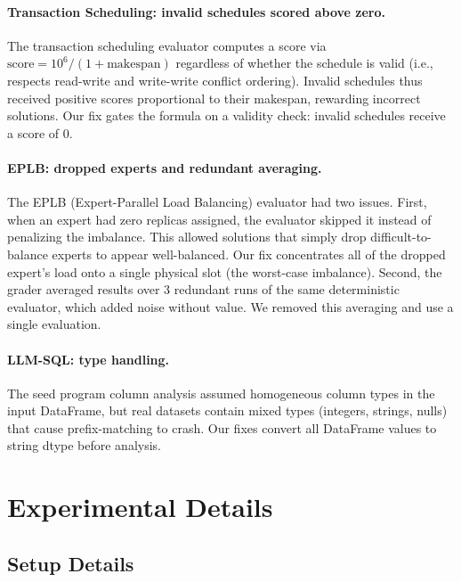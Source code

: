 \paragraph{Transaction Scheduling: invalid schedules scored above zero.}
The transaction scheduling evaluator computes a score via $\text{score} = 10^6 / (1 + \text{makespan})$ regardless of whether the schedule is valid (i.e., respects read-write and write-write conflict ordering). Invalid schedules thus received positive scores proportional to their makespan, rewarding incorrect solutions. Our fix gates the formula on a validity check: invalid schedules receive a score of 0.

\paragraph{EPLB: dropped experts and redundant averaging.}
The EPLB (Expert-Parallel Load Balancing) evaluator had two issues. First, when an expert had zero replicas assigned, the evaluator skipped it instead of penalizing the imbalance. This allowed solutions that simply drop difficult-to-balance experts to appear well-balanced. Our fix concentrates all of the dropped expert's load onto a single physical slot (the worst-case imbalance). Second, the grader averaged results over 3 redundant runs of the same deterministic evaluator, which added noise without value. We removed this averaging and use a single evaluation.

\paragraph{LLM-SQL: type handling.}
 The seed program column analysis assumed homogeneous column types in the input DataFrame, but real datasets contain mixed types (integers, strings, nulls) that cause prefix-matching to crash. Our fixes convert all DataFrame values to string dtype before analysis.

\section{Experimental Details}
\label{app:experiments}

\subsection{Setup Details}
\label{app:setup}

